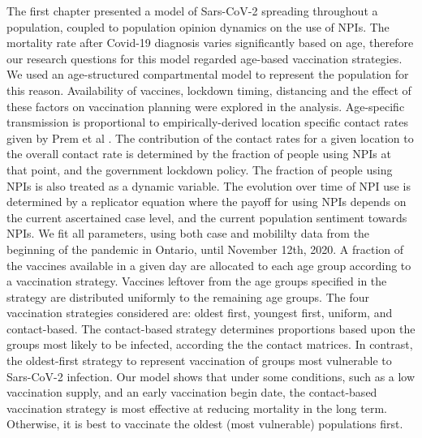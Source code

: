 The first chapter presented a model of Sars-CoV-2 spreading throughout a population, coupled to population opinion dynamics on the use of NPIs. The mortality rate after Covid-19 diagnosis varies significantly based on age, therefore our research questions for this model regarded age-based vaccination strategies. We used an age-structured compartmental model to represent the population for this reason. Availability of vaccines, lockdown timing, distancing and the effect of these factors on vaccination planning were explored in the analysis. Age-specific transmission is proportional to empirically-derived location specific contact rates given by Prem et al \cite{prem2020projecting}. The contribution of the contact rates for a given location to the overall contact rate is determined by the fraction of people using NPIs at that point, and the government lockdown policy. The fraction of people using NPIs is also treated as a dynamic variable. The evolution over time of NPI use is determined by a replicator equation where the payoff for using NPIs depends on the current ascertained case level, and the current population sentiment towards NPIs. We fit all parameters, using both case and mobililty data from the beginning of the pandemic in Ontario, until November 12th, 2020. A fraction of the vaccines available in a given day are allocated to each age group according to a vaccination strategy. Vaccines leftover from the age groups specified in the strategy are distributed uniformly to the remaining age groups. The four vaccination strategies considered are: oldest first, youngest first, uniform, and contact-based. The contact-based strategy determines proportions based upon the groups most likely to be infected, according the the contact matrices. In contrast, the oldest-first strategy to represent vaccination of groups most vulnerable to Sars-CoV-2 infection. Our model shows that under some conditions, such as a low vaccination supply, and an early vaccination begin date, the contact-based vaccination strategy is most effective at reducing mortality in the long term. Otherwise, it is best to vaccinate the oldest (most vulnerable) populations first.


